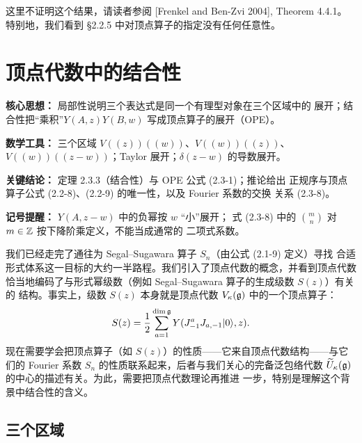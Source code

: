 这里不证明这个结果，请读者参阅 [Frenkel and Ben-Zvi 2004], Theorem 4.4.1。
特别地，我们看到 \S2.2.5 中对顶点算子的指定没有任何任意性。

\section{顶点代数中的结合性}

\setcounter{theorem}{0}

\begin{keypoints}
    \item \textbf{核心思想：} 局部性说明三个表达式是同一个有理型对象在三个区域中的
    展开；结合性把“乘积”$Y(A,z)Y(B,w)$ 写成顶点算子的展开（OPE）。
    \item \textbf{数学工具：} 三个区域 $V(\!(z)\!)(\!(w)\!)$、$V(\!(w)\!)(\!(z)\!)$、
    $V(\!(w)\!)(\!(z-w)\!)$；Taylor 展开；$\delta(z-w)$ 的导数展开。
    \item \textbf{关键结论：} 定理 2.3.3（结合性）与 OPE 公式 (2.3-1)；推论给出
    正规序与顶点算子公式 (2.2-8)、(2.2-9) 的唯一性，以及 Fourier 系数的交换
    关系 (2.3-8)。
    \item \textbf{记号提醒：} $Y(A,z-w)$ 中的负幂按 $w$ “小”展开；
    式 (2.3-8) 中的 $\binom{m}{n}$ 对 $m\in\mathbb{Z}$ 按下降阶乘定义，不能当成通常的
    二项式系数。
\end{keypoints}

我们已经走完了通往为 Segal--Sugawara 算子 $S_n$（由公式 (2.1-9) 定义）寻找
合适形式体系这一目标的大约一半路程。我们引入了顶点代数的概念，并看到顶点代数
恰当地编码了与形式幂级数（例如 Segal--Sugawara 算子的生成级数 $S(z)$）有关的
结构。事实上，级数 $S(z)$ 本身就是顶点代数 $V_\kappa(\mathfrak{g})$ 中的一个顶点算子：
\[
    S(z)=\frac12\sum_{a=1}^{\dim\mathfrak{g}}
    Y(J^a_{-1}J_{a,-1}|0\rangle,z).
\]
现在需要学会把顶点算子（如 $S(z)$）的性质——它来自顶点代数结构——与它们的
Fourier 系数 $S_n$ 的性质联系起来，后者与我们关心的完备泛包络代数
$\widetilde U_\kappa(\mathfrak{g})$ 的中心的描述有关。为此，需要把顶点代数理论再推进
一步，特别是理解这个背景中结合性的含义。

\subsection{三个区域}

